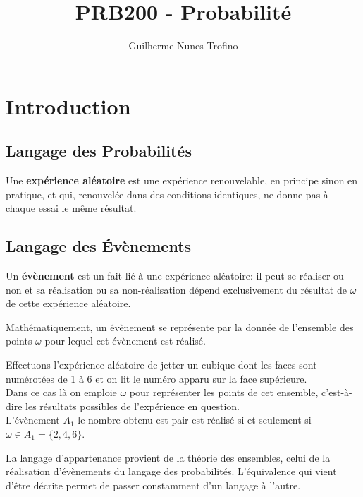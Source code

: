 \documentclass{article}
\title{PRB200 - Probabilité}
\author{Guilherme Nunes Trofino}
\begin{document}
\maketitle

\newpage\tableofcontents

\section{Introduction}
\subsection{Langage des Probabilités}
\begin{definition}
    Une \textbf{expérience aléatoire} est une expérience renouvelable, en principe sinon en pratique, et qui, renouvelée dans des conditions identiques, ne donne pas à chaque essai le même résultat.
\end{definition}
\subsection{Langage des Évènements}
\begin{definition}
    Un \textbf{évènement} est un fait lié à une expérience aléatoire: il peut se réaliser ou non et sa réalisation ou sa non-réalisation dépend exclusivement du résultat de $\omega$ de cette expérience aléatoire.
\end{definition}
\noindent Mathématiquement, un évènement se représente par la donnée de l'ensemble des points $\omega$ pour lequel cet évènement est réalisé.

\begin{example}
    Effectuons l'expérience aléatoire de jetter un cubique dont les faces sont numérotées de 1 à 6 et on lit le numéro apparu sur la face supérieure.\\

    Dans ce cas là on emploie $\omega$ pour représenter les points de cet ensemble, c'est-à-dire les résultats possibles de l'expérience en question.\\

    L'évènement $A_1$ le nombre obtenu est pair est réalisé si et seulement si $\omega \in A_1 = \{ 2, 4, 6 \}$.
\end{example}
\noindent La langage d'appartenance provient de la théorie des ensembles, celui de la réalisation d'évènements du langage des probabilités. L'équivalence qui vient d'être décrite permet de passer constamment d'un langage à l'autre.
\end{document}
